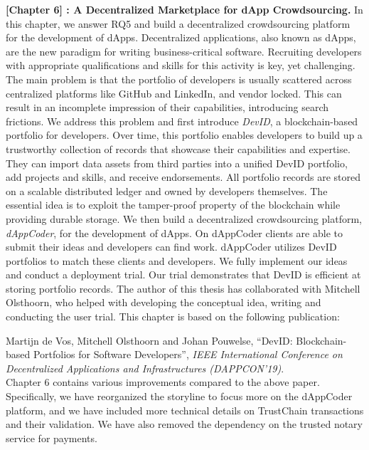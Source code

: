 \textbf{[Chapter 6] \Dappcoder{}: A Decentralized Marketplace for dApp Crowdsourcing.}
In this chapter, we answer RQ5 and build a decentralized crowdsourcing platform for the development of dApps.
Decentralized applications, also known as dApps, are the new paradigm for writing business-critical software.
Recruiting developers with appropriate qualifications and skills for this activity is key, yet challenging.
The main problem is that the portfolio of developers is usually scattered across centralized platforms like GitHub and LinkedIn, and vendor locked.
This can result in an incomplete impression of their capabilities, introducing search frictions.
We address this problem and first introduce \emph{DevID}, a blockchain-based portfolio for developers.
Over time, this portfolio enables developers to build up a trustworthy collection of records that showcase their capabilities and expertise.
They can import data assets from third parties into a unified DevID portfolio, add projects and skills, and receive endorsements.
All portfolio records are stored on a scalable distributed ledger and owned by developers themselves.
The essential idea is to exploit the tamper-proof property of the blockchain while providing durable storage.
We then build a decentralized crowdsourcing platform, \emph{dAppCoder}, for the development of dApps.
On dAppCoder clients are able to submit their ideas and developers can find work.
dAppCoder utilizes DevID portfolios to match these clients and developers.
We fully implement our ideas and conduct a deployment trial.
Our trial demonstrates that DevID is efficient at storing portfolio records.
The author of this thesis has collaborated with Mitchell Olsthoorn, who helped with developing the conceptual idea, writing and conducting the user trial.
This chapter is based on the following publication:

Martijn de Vos, Mitchell Olsthoorn and Johan Pouwelse, \enquote{DevID: Blockchain-based Portfolios for Software Developers}, \emph{IEEE International Conference on Decentralized Applications and Infrastructures (DAPPCON'19)}.\\

Chapter 6 contains various improvements compared to the above paper.
Specifically, we have reorganized the storyline to focus more on the dAppCoder platform, and we have included more technical details on TrustChain transactions and their validation.
We have also removed the dependency on the trusted notary service for payments.\\

